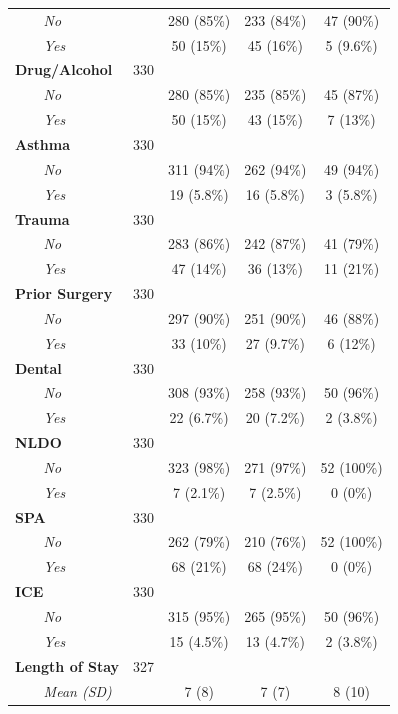 \documentclass[
]{article}
\begin{document}
\begin{table}[t]
\begin{tabular*}{0.7\linewidth}{@{\extracolsep{\fill}}lcccc}
{\itshape     No} &  & 280 (85\%) & 233 (84\%) & 47 (90\%) \\ 
{\itshape     Yes} &  & 50 (15\%) & 45 (16\%) & 5 (9.6\%) \\ 
{\bfseries Drug/Alcohol} & 330 &  &  &  \\ 
{\itshape     No} &  & 280 (85\%) & 235 (85\%) & 45 (87\%) \\ 
{\itshape     Yes} &  & 50 (15\%) & 43 (15\%) & 7 (13\%) \\ 
{\bfseries Asthma} & 330 &  &  &  \\ 
{\itshape     No} &  & 311 (94\%) & 262 (94\%) & 49 (94\%) \\ 
{\itshape     Yes} &  & 19 (5.8\%) & 16 (5.8\%) & 3 (5.8\%) \\ 
{\bfseries Trauma} & 330 &  &  &  \\ 
{\itshape     No} &  & 283 (86\%) & 242 (87\%) & 41 (79\%) \\ 
{\itshape     Yes} &  & 47 (14\%) & 36 (13\%) & 11 (21\%) \\ 
{\bfseries Prior Surgery} & 330 &  &  &  \\ 
{\itshape     No} &  & 297 (90\%) & 251 (90\%) & 46 (88\%) \\ 
{\itshape     Yes} &  & 33 (10\%) & 27 (9.7\%) & 6 (12\%) \\ 
{\bfseries Dental} & 330 &  &  &  \\ 
{\itshape     No} &  & 308 (93\%) & 258 (93\%) & 50 (96\%) \\ 
{\itshape     Yes} &  & 22 (6.7\%) & 20 (7.2\%) & 2 (3.8\%) \\ 
{\bfseries NLDO} & 330 &  &  &  \\ 
{\itshape     No} &  & 323 (98\%) & 271 (97\%) & 52 (100\%) \\ 
{\itshape     Yes} &  & 7 (2.1\%) & 7 (2.5\%) & 0 (0\%) \\ 
{\bfseries SPA} & 330 &  &  &  \\ 
{\itshape     No} &  & 262 (79\%) & 210 (76\%) & 52 (100\%) \\ 
{\itshape     Yes} &  & 68 (21\%) & 68 (24\%) & 0 (0\%) \\ 
{\bfseries ICE} & 330 &  &  &  \\ 
{\itshape     No} &  & 315 (95\%) & 265 (95\%) & 50 (96\%) \\ 
{\itshape     Yes} &  & 15 (4.5\%) & 13 (4.7\%) & 2 (3.8\%) \\ 
{\bfseries Length of Stay} & 327 &  &  &  \\ 
{\itshape     Mean (SD)} &  & 7 (8) & 7 (7) & 8 (10) \\ 

\end{tabular*}
\end{table}
\end{document}
